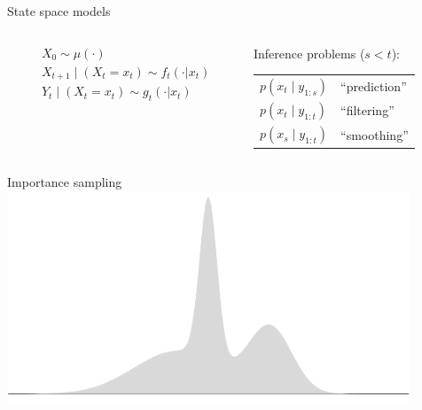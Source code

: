 \documentclass[aspectratio=169]{beamer}
\theoremstyle{definition}
\begin{document}
\begin{frame}{State space models}
\begin{columns}
\begin{column}{0.45\textwidth}
\begin{center}
\end{center}
\begin{align*}
& X_0 \sim \mu(\cdot) \\
& X_{t+1} \mid (X_t = x_t) \sim f_t(\cdot | x_t)\\
& Y_t \mid (X_t = x_t) \sim g_t(\cdot | x_t)
\end{align*}
\end{column}
\begin{column}{0.45\textwidth}
\pause
Inference problems ($s<t$):

\renewcommand{\arraystretch}{1.5}
\begin{tabular}{l l}
$p(x_{t} \mid y_{1:s})$ & ``prediction'' \\
$p(x_{t} \mid y_{1:t})$ & ``filtering'' \\
$p(x_{s} \mid y_{1:t})$ & ``smoothing''
\end{tabular}
\end{column}
\end{columns}

\end{frame}

\begin{frame}{Importance sampling}
\centering
\includegraphics[width=0.9\textwidth]{importance1.pdf}

\end{frame}
\end{document}
